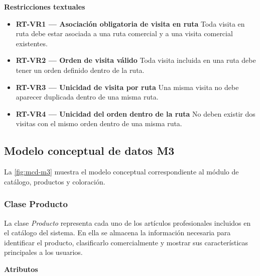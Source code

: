 \textbf{Restricciones textuales}

\begin{itemize}
      \item \textbf{RT-VR1 — Asociación obligatoria de visita en ruta} Toda visita en ruta debe estar asociada a una ruta comercial y a una visita comercial existentes.
      \item \textbf{RT-VR2 — Orden de visita válido} Toda visita incluida en una ruta debe tener un orden definido dentro de la ruta.
      \item \textbf{RT-VR3 — Unicidad de visita por ruta} Una misma visita no debe aparecer duplicada dentro de una misma ruta.
      \item \textbf{RT-VR4 — Unicidad del orden dentro de la ruta} No deben existir dos visitas con el mismo orden dentro de una misma ruta.
\end{itemize}

\subsection{Modelo conceptual de datos M3}

La \autoref{fig:mcd-m3} muestra el modelo conceptual correspondiente al módulo de catálogo, productos y coloración.


\subsubsection{Clase Producto}

La clase \textit{Producto} representa cada uno de los artículos profesionales incluidos en el catálogo del sistema. En ella se almacena la información necesaria para identificar el producto, clasificarlo comercialmente y mostrar sus características principales a los usuarios.

\textbf{Atributos}

